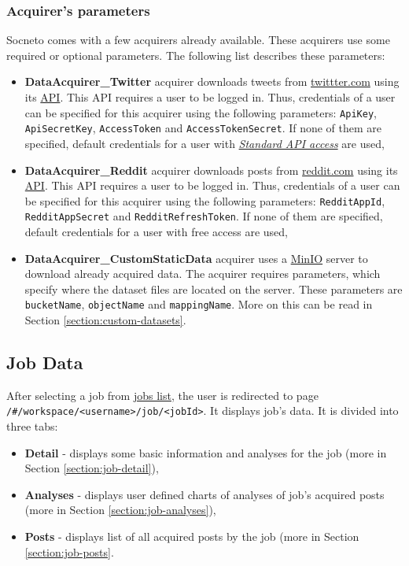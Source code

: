 \documentclass{article}
\begin{document}
\subsubsection{Acquirer's parameters} \label{section:acquirers-parameters}
Socneto comes with a few acquirers already available. These acquirers use some required or optional parameters. The following list describes these parameters:
\begin{itemize}
    \item \textbf{DataAcquirer\_Twitter} acquirer downloads tweets from \href{https://twitter.com/}{twittter.com} using its \href{https://developer.twitter.com/en/docs/api-reference-index}{API}. This API requires a user to be logged in. Thus, credentials of a user can be specified for this acquirer using the following parameters: \texttt{ApiKey}, \texttt{ApiSecretKey}, \texttt{AccessToken} and \texttt{AccessTokenSecret}. If none of them are specified, default credentials for a user with \textit{\href{https://developer.twitter.com/en/docs/basics/getting-started\#get-started-app.html}{Standard API access}} are used,
    
    \item \textbf{DataAcquirer\_Reddit} acquirer downloads posts from \href{https://www.reddit.com/}{reddit.com} using its \href{https://www.reddit.com/dev/api/}{API}. This API requires a user to be logged in. Thus, credentials of a user can be specified for this acquirer using the following parameters: \texttt{RedditAppId}, \texttt{RedditAppSecret} and \texttt{RedditRefreshToken}. If none of them are specified, default credentials for a user with free access are used,
    
    \item \textbf{DataAcquirer\_CustomStaticData} acquirer uses a \href{https://min.io/}{MinIO} server to download already acquired data. The acquirer requires parameters, which specify where the dataset files are located on the server. These parameters are \texttt{bucketName}, \texttt{objectName} and \texttt{mappingName}. More on this can be read in Section \ref{section:custom-datasets}.
\end{itemize}

\subsection{Job Data}\label{section:job-data}
After selecting a job from \href{section:jobs-list}{jobs list}, the user is redirected to page\\ \texttt{/\#/workspace/<username>/job/<jobId>}. It displays job's data. It is divided into three tabs: 
\begin{itemize}
    \item \textbf{Detail} - displays some basic information and analyses for the job (more in Section \ref{section:job-detail}),
    \item \textbf{Analyses} - displays user defined charts of analyses of job's acquired posts (more in Section \ref{section:job-analyses}),
    \item \textbf{Posts} - displays list of all acquired posts by the job (more in Section \ref{section:job-posts}.
\end{itemize}
\end{document}
